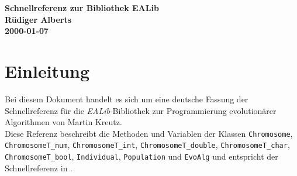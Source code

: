 \documentclass[12pt]{report}
\begin{document}
\textheight 23cm
\topmargin -0.54cm
\textwidth 16.5cm
\oddsidemargin -0.04cm
\evensidemargin -0.54cm


\newif\ifmethodgray
\methodgrayfalse
\def\method#1#2{%
  \ifmethodgray
    \psframebox*[framesep=1pt,fillcolor=lightgray,fillstyle=solid]{%
      \begin{minipage}{.873\textwidth}
        \begin{minipage}{17em} #1 \end{minipage}
        \begin{minipage}{17.7em} #2 \end{minipage}
      \end{minipage}}
    \methodgrayfalse
  \else
    \psframebox*[framesep=1pt]{%
      \begin{minipage}{.873\textwidth}
        \begin{minipage}{17em} #1 \end{minipage}
        \begin{minipage}{17.7em} #2 \end{minipage}
      \end{minipage}}
    \methodgraytrue
  \fi
}


\begin{center}
{\Large {\bf Schnellreferenz zur Bibliothek EALib}}\\
{\bf R\"udiger Alberts}\\
{\bf 2000-01-07}
\end{center}

\newpage
\tableofcontents
\newpage
\chapter{Einleitung}
Bei diesem Dokument handelt es sich um eine deutsche Fassung der
Schnellreferenz f\"ur die {\em EALib}-Bibliothek zur
Programmierung evolution\"arer Algorithmen von Martin Kreutz.\\
Diese Referenz beschreibt die Methoden und Variablen der Klassen
{\tt Chromosome}, {\tt ChromosomeT\_num}, {\tt ChromosomeT\_int},
{\tt ChromosomeT\_double}, {\tt ChromosomeT\_char}, \\
{\tt ChromosomeT\_bool}, {\tt Individual}, {\tt Population} und
{\tt EvoAlg} und entspricht der Schnellreferenz in \cite{EALib}.
\end{document}
